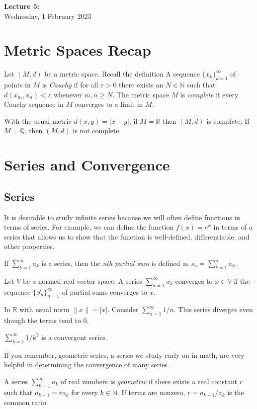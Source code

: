 \documentclass[11pt]{article}
\theoremstyle{definition}
\newcommand{\R}{\mathbb{R}}                      %
\newcommand{\Q}{\mathbb{Q}}
\newcommand{\N}{\mathbb{N}}
\begin{document}
\thispagestyle{empty}

\begin{center}
{\LARGE \bf Lecture 5: }\\
{\large Wednesday, 1 February 2023}\\

\end{center}
\section{Metric Spaces Recap}
Let $(M,d)$ be a metric space. Recall the definition
 A sequence $\{x_k\}_{k=1}^\infty$ of points in $M$ is \textit{Cauchy} if for all $\varepsilon>0$ there exists an $N\in\N$ such that $d(x_m,x_n)<\varepsilon$ whenever $m,n\geq N$. The metric space $M$ is \textit{complete} if every Cauchy sequence in $M$ converges to a limit in $M$.


\ex With the usual metric $d(x,y)=|x-y|$, if $M=\R$ then $(M,d)$ is complete. If $M=\Q$, then $(M,d)$ is not complete.

\section{Series and Convergence}
\subsection{Series}
It is desirable to study infinite series because we will often define functions in terms of series. For example, we can define the function $f(x)=e^x$ in terms of a series that allows us to show that the function is well-defined, differentiable, and other properties.

\note If $\sum_{k=1}^\infty a_k$ is a series, then the \textit{nth partial sum} is defined as $s_n=\sum_{k=1}^n a_k$.

 Let $V$ be a normed real vector space. A series $\sum_{k=1}^\infty x_k$ converges to $x\in V$ if the sequence $\{S_n\}_{n=1}^\infty$ of partial sums converges to $x$.

\ex In $\R$ with usual norm $\|x\|=|x|$. Consider $\sum_{n=1}^\infty 1/n$. This series diverges even though the terms tend to 0.

\ex $\sum_{k=1}^\infty 1/k^2$ is a convergent series.

If you remember, geometric series, a series we study early on in math, are very helpful in determining the convergence of many series.

 A series $\sum_{k=1}^\infty a_k$ of real numbers is \textit{geometric} if there exists a real constant $r$ such that $a_{k+1}=ra_k$ for every $k\in \N$. If terms are nonzero, $r=a_{k+1}/a_k$ is the common ratio.
\end{document}
